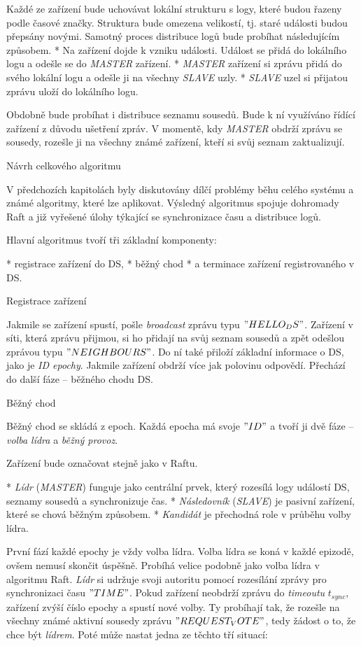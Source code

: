 Každé ze zařízení bude uchovávat lokální {\sbf strukturu s logy}, které budou řazeny podle časové značky. Struktura bude omezena velikostí, tj. staré události budou přepsány novými. Samotný proces distribuce logů bude probíhat následujícím způsobem.
\begitems
* Na zařízení dojde k vzniku události. Událost se přidá do lokálního logu a odešle se do {\em MASTER} zařízení.
* {\em MASTER} zařízení si zprávu přidá do svého lokální logu a odešle ji na všechny {\em SLAVE} uzly.
* {\em SLAVE} uzel si přijatou zprávu uloží do lokálního logu.
\enditems

Obdobně bude probíhat i distribuce seznamu sousedů. Bude k ní využíváno řídící zařízení z důvodu ušetření zpráv. V momentě, kdy {\em MASTER} obdrží zprávu se sousedy, rozešle ji na všechny známé zařízení, kteří si svůj seznam zaktualizují.

\sec Návrh celkového algoritmu

V předchozích kapitolách byly diskutovány dílčí problémy běhu celého systému a známé algoritmy, které lze aplikovat. Výsledný algoritmus spojuje dohromady Raft a již vyřešené úlohy týkající se synchronizace času a distribuce logů.

Hlavní algoritmus tvoří tři {\sbf základní komponenty}:

\begitems
* registrace zařízení do DS,
* běžný chod
* a terminace zařízení registrovaného v DS. 
\enditems

\secc Registrace zařízení

Jakmile se zařízení spustí, pošle {\em broadcast} zprávu typu $"HELLO_DS"$. Zařízení v síti, která zprávu přijmou, si ho přidají na svůj seznam sousedů a zpět odešlou zprávou typu $"NEIGHBOURS"$. Do ní také přiloží základní informace o DS, jako je {\em ID epochy}. Jakmile zařízení obdrží více jak polovinu odpovědí. Přechází do další fáze – běžného chodu DS.

\secc Běžný chod

Běžný chod se skládá z {\sbf epoch}. Každá epocha má svoje $"ID"$ a tvoří ji dvě fáze – {\em volba lídra} a {\em běžný provoz}.

Zařízení bude označovat stejně jako v Raftu.

\begitems
* {\em Lídr} ({\em MASTER}) funguje jako centrální prvek, který rozesílá logy událostí DS, seznamy sousedů a synchronizuje čas.
* {\em Následovník} ({\em SLAVE}) je pasivní zařízení, které se chová běžným způsobem.
* {\em Kandidát} je přechodná role v průběhu volby lídra.
\enditems

První fází každé epochy je vždy {\sbf volba lídra}. Volba lídra se koná v každé epizodě, ovšem nemusí skončit úspěšně. Probíhá velice podobně jako volba lídra v algoritmu Raft. {\em Lídr} si udržuje svoji autoritu pomocí rozesílání zprávy pro synchronizaci času $"TIME"$. Pokud zařízení neobdrží zprávu do {\em timeoutu} $t_{sync}$, zařízení zvýší číslo epochy a spustí nové volby. Ty probíhají tak, že rozešle na všechny známé aktivní sousedy zprávu $"REQUEST_VOTE"$, tedy žádost o to, že chce být {\em lídrem}. Poté může nastat jedna ze těchto tří situací:

